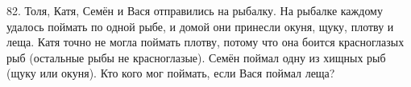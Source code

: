 82. Толя, Катя, Семён и Вася отправились на рыбалку. На рыбалке каждому удалось поймать по одной рыбе, и домой они принесли окуня, щуку, плотву и леща. Катя точно не могла поймать плотву, потому что она боится красноглазых рыб (остальные рыбы не красноглазые). Семён поймал одну из хищных рыб (щуку или окуня). Кто кого мог поймать, если Вася поймал леща?\\
